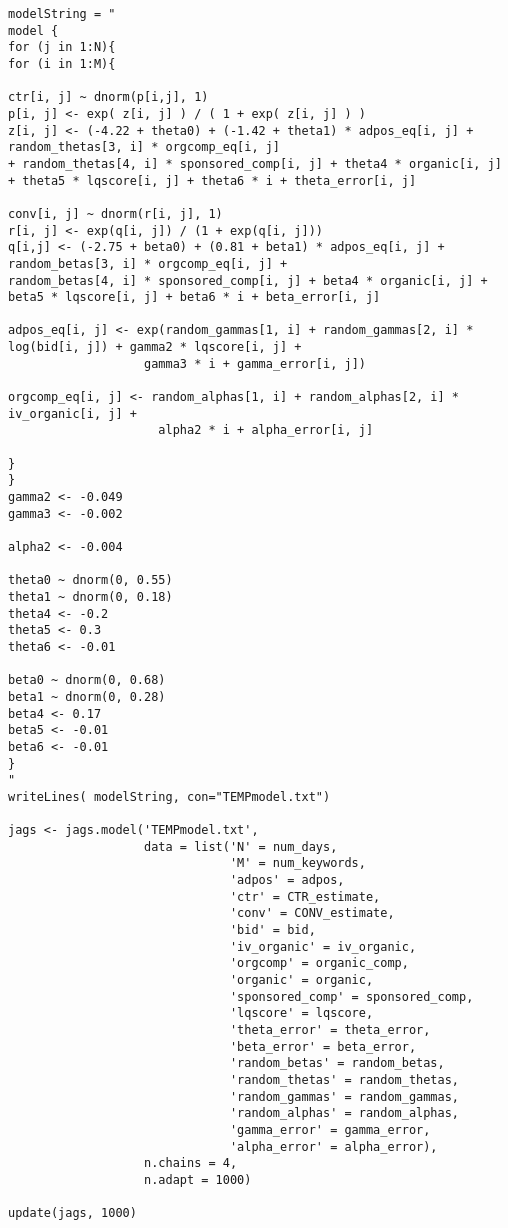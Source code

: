 \begin{lstlisting}[caption={Estimating the model with a very basic JAGS version}]
modelString = "
model {
for (j in 1:N){
for (i in 1:M){

ctr[i, j] ~ dnorm(p[i,j], 1)
p[i, j] <- exp( z[i, j] ) / ( 1 + exp( z[i, j] ) )
z[i, j] <- (-4.22 + theta0) + (-1.42 + theta1) * adpos_eq[i, j] + random_thetas[3, i] * orgcomp_eq[i, j] 
+ random_thetas[4, i] * sponsored_comp[i, j] + theta4 * organic[i, j]
+ theta5 * lqscore[i, j] + theta6 * i + theta_error[i, j] 

conv[i, j] ~ dnorm(r[i, j], 1)
r[i, j] <- exp(q[i, j]) / (1 + exp(q[i, j]))
q[i,j] <- (-2.75 + beta0) + (0.81 + beta1) * adpos_eq[i, j] + random_betas[3, i] * orgcomp_eq[i, j] + 
random_betas[4, i] * sponsored_comp[i, j] + beta4 * organic[i, j] + 
beta5 * lqscore[i, j] + beta6 * i + beta_error[i, j]

adpos_eq[i, j] <- exp(random_gammas[1, i] + random_gammas[2, i] * log(bid[i, j]) + gamma2 * lqscore[i, j] +
                   gamma3 * i + gamma_error[i, j])

orgcomp_eq[i, j] <- random_alphas[1, i] + random_alphas[2, i] * iv_organic[i, j] +
                     alpha2 * i + alpha_error[i, j]

}
}
gamma2 <- -0.049
gamma3 <- -0.002

alpha2 <- -0.004

theta0 ~ dnorm(0, 0.55)
theta1 ~ dnorm(0, 0.18)
theta4 <- -0.2
theta5 <- 0.3 
theta6 <- -0.01

beta0 ~ dnorm(0, 0.68)
beta1 ~ dnorm(0, 0.28)
beta4 <- 0.17
beta5 <- -0.01
beta6 <- -0.01
}
"
writeLines( modelString, con="TEMPmodel.txt")

jags <- jags.model('TEMPmodel.txt',
                   data = list('N' = num_days,
                               'M' = num_keywords,
                               'adpos' = adpos,
                               'ctr' = CTR_estimate,
                               'conv' = CONV_estimate,
                               'bid' = bid,
                               'iv_organic' = iv_organic,
                               'orgcomp' = organic_comp,
                               'organic' = organic,
                               'sponsored_comp' = sponsored_comp,
                               'lqscore' = lqscore,
                               'theta_error' = theta_error,
                               'beta_error' = beta_error,
                               'random_betas' = random_betas,
                               'random_thetas' = random_thetas,
                               'random_gammas' = random_gammas,
                               'random_alphas' = random_alphas,
                               'gamma_error' = gamma_error,
                               'alpha_error' = alpha_error),
                   n.chains = 4,
                   n.adapt = 1000)

update(jags, 1000)

\end{lstlisting}